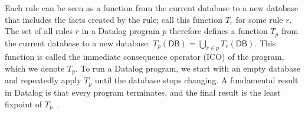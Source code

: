 Each rule can be seen as a function 
 from the current database to a new database that includes
 the facts created by the rule;
 call this function $T_r$ for some rule $r$.
The set of all rules $r$ in a Datalog program $p$ 
 therefore defines a function $T_p$ 
 from the current database to a new database: 
 $T_p(\mathsf{DB}) = \bigcup_{r \in p} T_r(\mathsf{DB})$.
This function is called the immediate consequence operator (ICO) of the program,
  which we denote $T_p$.
To run a Datalog program, we start with an empty database and
 repeatedly apply $T_p$ until the database stops changing.
A fundamental result in Datalog is that every program terminates, 
  and the final result is the least fixpoint of $T_p$~\citep{alice-book}.


